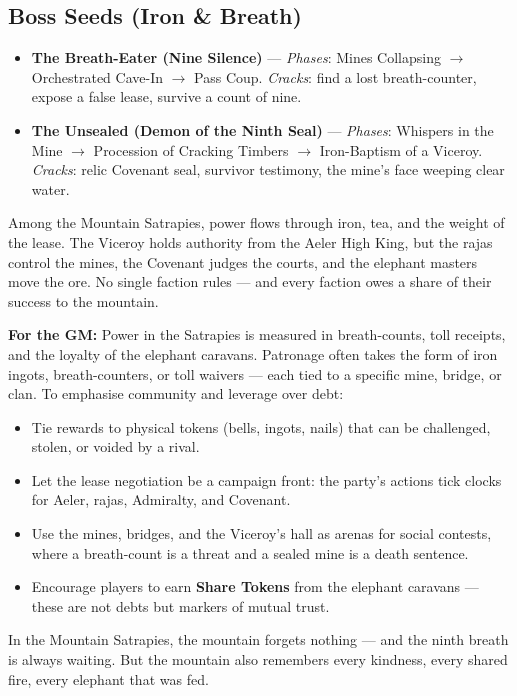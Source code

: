 \subsection*{Boss Seeds (Iron \& Breath)}
\begin{itemize}
\item \textbf{The Breath-Eater (Nine Silence)} — \emph{Phases}: Mines Collapsing $\rightarrow$ Orchestrated Cave-In $\rightarrow$ Pass Coup. \emph{Cracks}: find a lost breath-counter, expose a false lease, survive a count of nine.
\item \textbf{The Unsealed (Demon of the Ninth Seal)} — \emph{Phases}: Whispers in the Mine $\rightarrow$ Procession of Cracking Timbers $\rightarrow$ Iron-Baptism of a Viceroy. \emph{Cracks}: relic Covenant seal, survivor testimony, the mine's face weeping clear water.
\end{itemize}

\begin{tcolorbox}[colback=black!3,colframe=black!40!white,title={Patronage \& Power}]
Among the Mountain Satrapies, power flows through iron, tea, and the weight of the lease. The Viceroy holds authority from the Aeler High King, but the rajas control the mines, the Covenant judges the courts, and the elephant masters move the ore. No single faction rules — and every faction owes a share of their success to the mountain.

\textbf{For the GM:}  
Power in the Satrapies is measured in breath-counts, toll receipts, and the loyalty of the elephant caravans. Patronage often takes the form of iron ingots, breath-counters, or toll waivers — each tied to a specific mine, bridge, or clan. To emphasise community and leverage over debt:
\begin{itemize}
\item Tie rewards to physical tokens (bells, ingots, nails) that can be challenged, stolen, or voided by a rival.
\item Let the lease negotiation be a campaign front: the party's actions tick clocks for Aeler, rajas, Admiralty, and Covenant.
\item Use the mines, bridges, and the Viceroy's hall as arenas for social contests, where a breath-count is a threat and a sealed mine is a death sentence.
\item Encourage players to earn \textbf{Share Tokens} from the elephant caravans — these are not debts but markers of mutual trust.
\end{itemize}
In the Mountain Satrapies, the mountain forgets nothing — and the ninth breath is always waiting. But the mountain also remembers every kindness, every shared fire, every elephant that was fed.
\end{tcolorbox}

